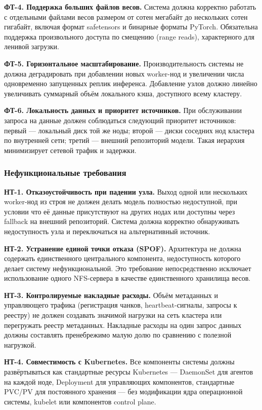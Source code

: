 \textbf{ФТ-4. Поддержка больших файлов весов.} Система должна корректно работать с отдельными файлами весов размером от сотен мегабайт до нескольких сотен гигабайт, включая формат safetensors и бинарные форматы PyTorch. Обязательна поддержка произвольного доступа по смещению (range reads), характерного для ленивой загрузки.

\textbf{ФТ-5. Горизонтальное масштабирование.} Производительность системы не должна деградировать при добавлении новых worker-нод и увеличении числа одновременно запущенных реплик инференса. Добавление узлов должно линейно увеличивать суммарный объём локального кэша, доступного всему кластеру.

\textbf{ФТ-6. Локальность данных и приоритет источников.} При обслуживании запроса на данные должен соблюдаться следующий приоритет источников: первый --- локальный диск той же ноды; второй --- диски соседних нод кластера по внутренней сети; третий --- внешний репозиторий модели. Такая иерархия минимизирует сетевой трафик и задержки.

\subsubsection{Нефункциональные требования}

\textbf{НТ-1. Отказоустойчивость при падении узла.} Выход одной или нескольких worker-нод из строя не должен делать модель полностью недоступной, при условии что её данные присутствуют на других нодах или доступны через fallback на внешний репозиторий. Система должна корректно обнаруживать недоступность узла и переключаться на альтернативный источник.

\textbf{НТ-2. Устранение единой точки отказа (SPOF).} Архитектура не должна содержать единственного центрального компонента, недоступность которого делает систему нефункциональной. Это требование непосредственно исключает использование одного NFS-сервера в качестве единственного хранилища весов.

\textbf{НТ-3. Контролируемые накладные расходы.} Объём метаданных и управляющего трафика (регистрация чанков, heartbeat-сигналы, запросы к реестру) не должен создавать значимой нагрузки на сеть кластера или перегружать реестр метаданных. Накладные расходы на один запрос данных должны составлять пренебрежимо малую долю по сравнению с полезной нагрузкой.

\textbf{НТ-4. Совместимость с Kubernetes.} Все компоненты системы должны развёртываться как стандартные ресурсы Kubernetes --- DaemonSet для агентов на каждой ноде, Deployment для управляющих компонентов, стандартные PVC/PV для постоянного хранения --- без модификации ядра операционной системы, kubelet или компонентов control plane.

